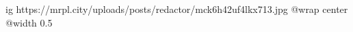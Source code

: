  
 
 
 
 

\ifcmt
  ig https://mrpl.city/uploads/posts/redactor/mck6h42uf4lkx713.jpg
  @wrap center
  @width 0.5
\fi
